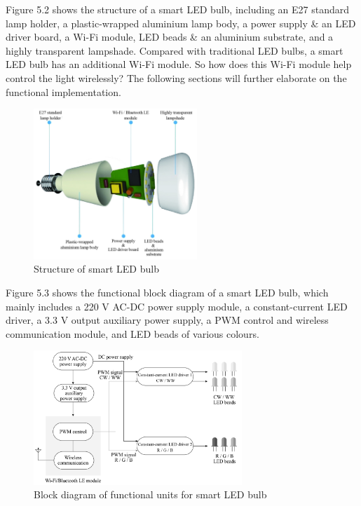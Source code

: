 \documentclass[a4paper,12pt,openany]{book}
\begin{document}
Figure 5.2 shows the structure of a smart LED bulb, including an E27 standard lamp holder, a plastic-wrapped aluminium lamp body, a power supply \& an LED driver board, a Wi-Fi module, LED beads \& an aluminium substrate, and a highly transparent lampshade. Compared with traditional LED bulbs, a smart LED bulb has an additional Wi-Fi module. So how does this Wi-Fi module help control the light wirelessly? The following sections will further elaborate on the functional implementation.

\begin{figure}[h!]
    \centering
    \includegraphics[width=0.55\textwidth]{D5Z/5-2}
    \caption{Structure of smart LED bulb}
\end{figure}

Figure 5.3 shows the functional block diagram of a smart LED bulb, which mainly includes a 220 V AC-DC power supply module, a constant-current LED driver, a 3.3 V output auxiliary power supply, a PWM control and wireless communication module, and LED beads of various colours.

\begin{figure}[h!]
    \centering
    \includegraphics[width=0.7\textwidth]{D5Z/5-3}
    \caption{Block diagram of functional units for smart LED bulb}
\end{figure}
\end{document}

